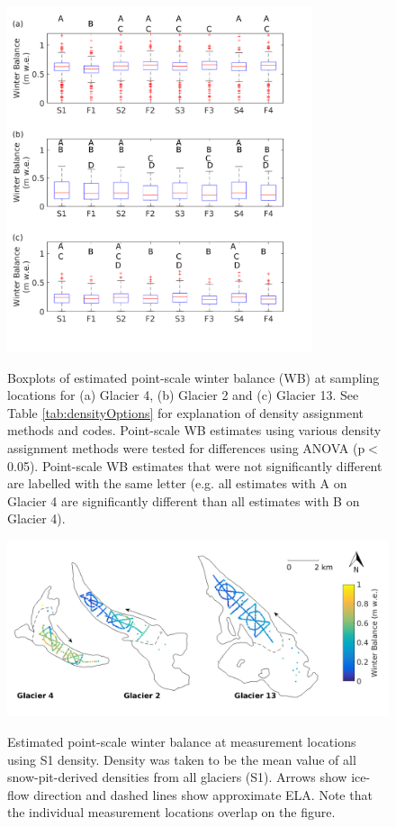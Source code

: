 \documentclass{sfuthesis}
\begin{document}
{\begin{figure}[H]
	\centering
	\includegraphics[width = 0.8\textwidth]{AllSWEopts_boxplot.png}\\
	\caption[Boxplots of estimated point-scale winter balance (WB) at sampling locations for study glaciers]{Boxplots of estimated point-scale winter balance (WB) at sampling locations for (a) Glacier 4, (b) Glacier 2 and (c) Glacier 13. See Table \ref{tab:densityOptions} for explanation of density assignment methods and codes. Point-scale WB estimates using various density assignment methods were tested for differences using ANOVA (p$<$0.05). Point-scale WB estimates that were not significantly different are labelled with the same letter (e.g. all estimates with A on Glacier 4 are significantly different than all estimates with B on Glacier 4).}
	\label{fig:AllSWEopts_boxplot}
\end{figure}


\begin{figure}[H]
	\centering
	\includegraphics[width = \textwidth]{SWEmap_opt2.png}\\
	\caption[Estimated point-scale winter balance at measurement locations using S1 density]{Estimated point-scale winter balance at measurement locations using S1 density. Density was taken to be the mean value of all snow-pit-derived densities from all glaciers (S1). Arrows show ice-flow direction and dashed lines show approximate ELA. Note that the individual measurement locations overlap on the figure.}
	\label{fig:SWEmap_S1}
\end{figure}

}
\end{document}
